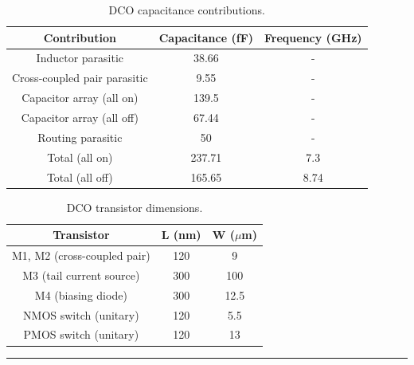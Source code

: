 \begin{table}[H]
    \centering
    \caption{DCO capacitance contributions.}
    \begin{tabular}{|c|c|c|}
        \hline
        Contribution & Capacitance (fF) & Frequency (GHz) \\
        \hline
        Inductor parasitic & 38.66 & - \\
        Cross-coupled pair parasitic & 9.55 & - \\
        Capacitor array (all on) & 139.5 & - \\
        Capacitor array (all off) & 67.44 & - \\
        Routing parasitic & 50 & - \\
        \hline
        Total (all on) & 237.71 & 7.3 \\
        Total (all off) & 165.65 & 8.74 \\
        \hline
    \end{tabular}
    \label{tab:DCO_capacitance_contribution}
\end{table}

\begin{table}[H]
    \centering
    \caption{DCO transistor dimensions.}
    \begin{tabular}{|c|c|c|}
        \hline
        Transistor & L (nm) & W ($\mu$m) \\
        \hline
        M1, M2 (cross-coupled pair) & 120 & 9 \\
        M3 (tail current source) & 300 & 100 \\
        M4 (biasing diode) & 300 & 12.5 \\
        NMOS switch (unitary) & 120 & 5.5 \\
        PMOS switch (unitary) & 120 & 13 \\
        \hline
    \end{tabular}
    \label{tab:DCO_dimensions}
\end{table}


\noindent\rule{\textwidth}{1pt}